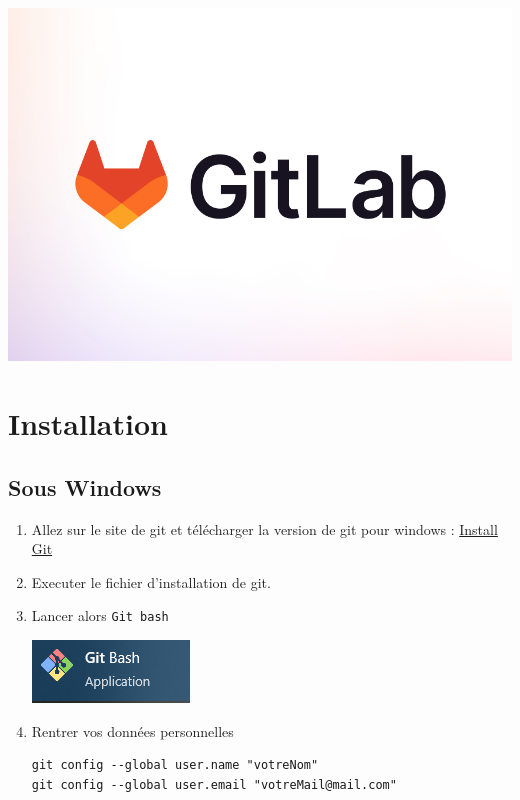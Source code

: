 \documentclass[french, 12pt]{article}%
\begin{document}
\begin{center}
\includegraphics[scale=0.1]{./ressource/gitLab}
\end{center}


\section{Installation}

 \subsection{Sous Windows}
 
\begin{enumerate}
\item Allez sur le site de git et télécharger la version de git pour windows : \href{https://gitforwindows.org/}{Install Git}
\item Executer le fichier d'installation de git.
\item Lancer alors 	\verb?Git bash?

\begin{center}
\includegraphics[scale=0.7]{./ressource/gitbash}
\end{center}

\item Rentrer vos données personnelles 

\begin{lstlisting}[style=commande]
git config --global user.name "votreNom"
git config --global user.email "votreMail@mail.com"
\end{lstlisting}
\end{enumerate}
\end{document}
